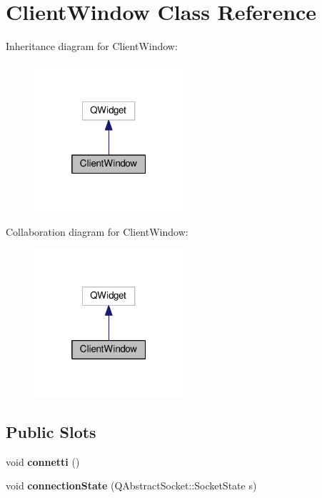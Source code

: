 \hypertarget{classClientWindow}{}\section{Client\+Window Class Reference}
\label{classClientWindow}


Inheritance diagram for Client\+Window\+:
\nopagebreak
\begin{figure}[H]
\begin{center}
\leavevmode
\includegraphics[width=157pt]{classClientWindow__inherit__graph}
\end{center}
\end{figure}


Collaboration diagram for Client\+Window\+:
\nopagebreak
\begin{figure}[H]
\begin{center}
\leavevmode
\includegraphics[width=157pt]{classClientWindow__coll__graph}
\end{center}
\end{figure}
\subsection*{Public Slots}
\begin{DoxyCompactItemize}
\item 
\mbox{\label{classClientWindow_a8438dfd883dec996752761c7cf3a6218}} 
void {\bfseries connetti} ()
\item 
\mbox{\label{classClientWindow_a3ba1088e8ef18d7203eb848b90fa4460}} 
void {\bfseries connection\+State} (Q\+Abstract\+Socket\+::\+Socket\+State s)
\end{DoxyCompactItemize}
